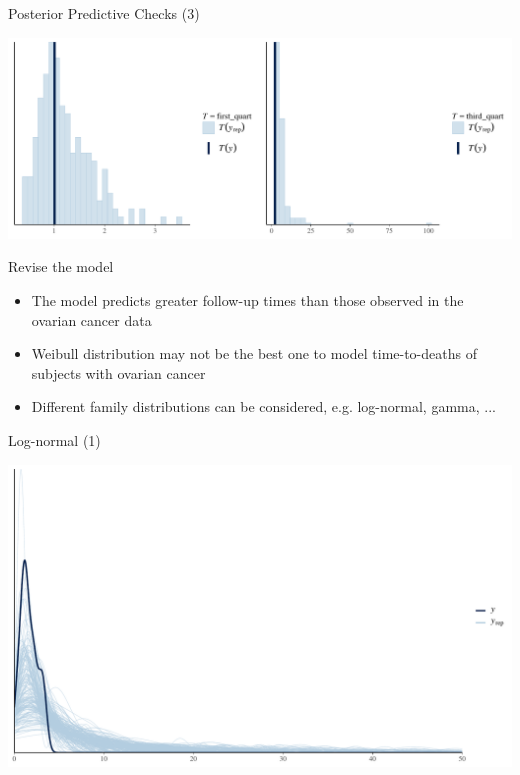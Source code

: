 \documentclass[ignorenonframetext,a4paper]{beamer}
\begin{document}
\begin{frame}{Posterior Predictive Checks (3)}

\includegraphics{DB_presentation_case_study_files/figure-beamer/unnamed-chunk-14-1.pdf}

\end{frame}

\begin{frame}{Revise the model}

\begin{itemize}
  \item{The model predicts greater follow-up times than those observed
        in the ovarian cancer data}
  \item{Weibull distribution may not be the best one to model 
        time-to-deaths of subjects with ovarian cancer}
  \item{Different family distributions can be considered, e.g.
        log-normal, gamma, ...}
\end{itemize}

\end{frame}

\begin{frame}{Log-normal (1)}

\includegraphics{DB_presentation_case_study_files/figure-beamer/unnamed-chunk-15-1.pdf}

\end{frame}
\end{document}
